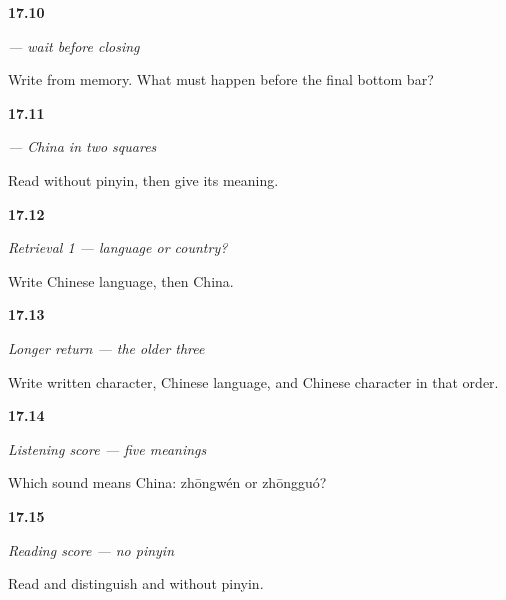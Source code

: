 \noindent\begin{minipage}[t]{\linewidth}
\raggedright
\hypertarget{review-ZH-W17-guo-delayed-write}{\textbf{17.10}} \emph{ — wait before closing}\par
\small Write  from memory. What must happen before the final bottom bar?
\end{minipage}\par\medskip

\noindent\begin{minipage}[t]{\linewidth}
\raggedright
\hypertarget{review-ZH-C17-zhongguo-read}{\textbf{17.11}} \emph{ — China in two squares}\par
\small Read  without pinyin, then give its meaning.
\end{minipage}\par\medskip

\noindent\begin{minipage}[t]{\linewidth}
\raggedright
\hypertarget{review-ZH-R17-country-language-r1-contrast}{\textbf{17.12}} \emph{Retrieval 1 — language or country?}\par
\small Write Chinese language, then China.
\end{minipage}\par\medskip

\noindent\begin{minipage}[t]{\linewidth}
\raggedright
\hypertarget{review-ZH-R17-old-three-r2-recall}{\textbf{17.13}} \emph{Longer return — the older three}\par
\small Write written character, Chinese language, and Chinese character in that order.
\end{minipage}\par\medskip

\noindent\begin{minipage}[t]{\linewidth}
\raggedright
\hypertarget{review-ZH-R17-listening-five-contrast}{\textbf{17.14}} \emph{Listening score — five meanings}\par
\small Which sound means China: zhōngwén or zhōngguó?
\end{minipage}\par\medskip

\noindent\begin{minipage}[t]{\linewidth}
\raggedright
\hypertarget{review-ZH-R17-reading-five-pair}{\textbf{17.15}} \emph{Reading score — no pinyin}\par
\small Read and distinguish  and  without pinyin.
\end{minipage}\par\medskip

